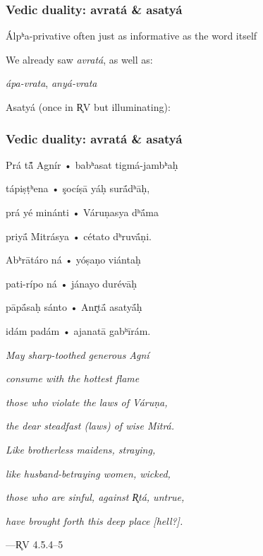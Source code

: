 \documentclass[pdf]{beamer}
\newcommand{\Subitem}[1]{{\setlength\itemindent{12pt} \item[-] #1}}
\begin{document}
\begin{frame} \frametitle{Vedic duality: avratá \& asatyá}
\begin{itemize}
	\item Álpʰa-privative often just as informative as the word itself
	\item We already saw \textit{avratá}, as well as:
	\Subitem {\textit{ápa-vrata}, \textit{anyá-vrata}}
	\item Asatyá (once in R̥V but illuminating):
\end{itemize}
\end{frame}

\begin{frame} \frametitle{Vedic duality: avratá \& asatyá}
\begin{center}
\begin{multicols}{2}
\small{
	Prá tā̃́ Agnír • babʰasat tigmá-jambʰaḥ

	tápiṣṭʰena • şocíṣā yáḥ surā́dʰāḥ,

	prá yé minánti • Váruṇasya dʰā́ma

	priyā́ Mitrásya • cétato dʰruvā́ṇi.

	\vspace{12pt}

	Abʰrātáro ná • yóṣaṇo viántaḥ

	pati-rípo ná • jánayo durévāḥ

	pāpā́saḥ sánto • Anr̥tā́ asatyā́ḥ

	idám padám • ajanatā gabʰīrám.

	\vspace{12pt}

	\textit{May sharp-toothed generous Agní}

	\textit{consume with the hottest flame}

	\textit{those who violate the laws of Váruṇa,}

	\textit{the dear steadfast (laws) of wise Mitrá.}

	\vspace{12pt}

	\textit{Like brotherless maidens, straying,}

	\textit{like husband-betraying women, wicked,}

	\textit{those who are sinful, against R̥tá, untrue,}

	\textit{have brought forth this deep place [hell?].}
}
\end{multicols}
 ---R̥V 4.5.4--5
\end{center}
\end{frame}
\end{document}
